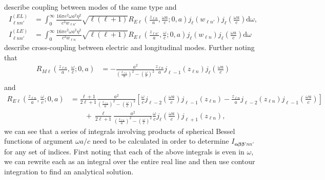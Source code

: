 describe coupling between modes of the same type and
\begin{equation}
\begin{split}
I_{\ell nn'}^{(EL)} &= \int_0^\infty\frac{16\pi e^2\omega a^2\eta^2}{c^2w_{\ell n'}}\sqrt{\ell(\ell + 1)}R_{E\ell}\!\left(\frac{z_{\ell n}}{a},\frac{\omega a}{c};0,a\right)j_\ell(w_{\ell n'})j_\ell\!\left(\frac{\omega a}{c}\right)\mathrm{d}\omega,\\
I_{\ell nn'}^{(LE)} &= \int_0^\infty\frac{16\pi e^2\omega a^2\eta^2}{c^2w_{\ell n}}\sqrt{\ell(\ell + 1)}R_{E\ell}\!\left(\frac{z_{\ell n'}}{a},\frac{\omega}{c};0,a\right)j_\ell(w_{\ell n})j_\ell\!\left(\frac{\omega a}{c}\right)\mathrm{d}\omega
\end{split}
\end{equation}
describe cross-coupling between electric and longitudinal modes. Further noting that
\begin{equation}
\begin{split}
R_{M\ell}\!\left(\frac{z_{\ell n}}{a},\frac{\omega}{c};0,a\right) 
&= -\frac{a^2}{\left(\frac{z_{\ell n}}{a}\right)^2 - \left(\frac{\omega}{c}\right)^2}\frac{z_{\ell n}}{a}j_{\ell - 1}\!\left(z_{\ell n}\right)j_{\ell}\!\left(\frac{\omega a}{c}\right)\\
\end{split}
\end{equation}
and
\begin{equation}
\begin{split}
R_{E\ell}\!\left(\frac{z_{\ell n}}{a},\frac{\omega}{c};0,a\right) 
&= \frac{\ell + 1}{2\ell + 1}\frac{a^2}{\left(\frac{z_{\ell n}}{a}\right)^2 - \left(\frac{\omega}{c}\right)^2}\left[\frac{\omega}{c}j_{\ell - 2}\!\left(\frac{\omega a}{c}\right)j_{\ell - 1}\!\left(z_{\ell n}\right) - \frac{z_{\ell n}}{a}j_{\ell - 2}\!\left(z_{\ell n}\right)j_{\ell - 1}\!\left(\frac{\omega a}{c}\right)\right]\\
&\qquad + \frac{\ell}{2\ell + 1}\frac{a^2}{\left(\frac{z_{\ell n}}{a}\right)^2 - \left(\frac{\omega}{c}\right)^2}\frac{\omega}{c}j_{\ell}\!\left(\frac{\omega a}{c}\right)j_{\ell + 1}\!\left(z_{\ell n}\right),
\end{split}
\end{equation}
we can see that a series of integrals involving products of spherical Bessel functions of argument $\omega a/c$ need to be calculated in order to determine $I_{\bm{\alpha}\bm{\beta}\bm{\beta}'nn'}$ for any set of indices. First noting that each of the above integrals is even in $\omega$, we can rewrite each as an integral over the entire real line and then use contour integration to find an analytical solution. 

